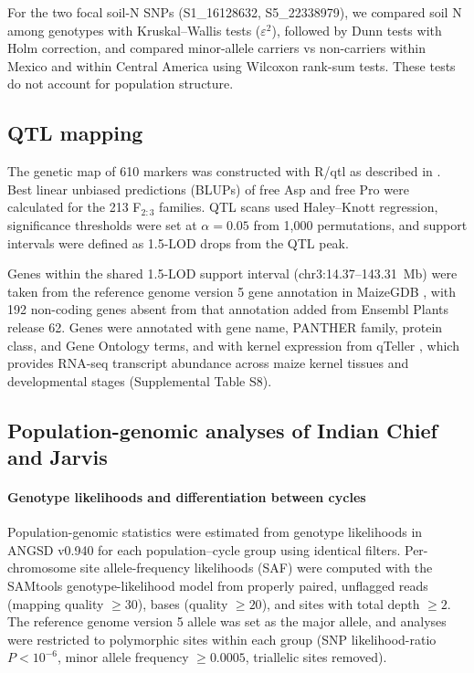 \documentclass[11pt]{article}
\begin{document}
For the two focal soil-N SNPs (S1\_16128632, S5\_22338979), we compared soil N among genotypes with Kruskal--Wallis tests ($\varepsilon^2$), followed by Dunn tests with Holm correction, and compared minor-allele carriers vs non-carriers within Mexico and within Central America using Wilcoxon rank-sum tests. These tests do not account for population structure.

\subsection*{QTL mapping}
The genetic map of 610 markers was constructed with R/qtl \citep{Broman2003} as described in \citet{Fitzsimmons2026KernelKitchen}. Best linear unbiased predictions (BLUPs) of free Asp and free Pro were calculated for the 213 F$_{2:3}$ families. QTL scans used Haley--Knott regression, significance thresholds were set at $\alpha = 0.05$ from 1,000 permutations, and support intervals were defined as 1.5-LOD drops from the QTL peak.

Genes within the shared 1.5-LOD support interval (chr3:14.37--143.31~Mb) were taken from the reference genome version 5 gene annotation in MaizeGDB \citep{MaizeGDB}, with 192 non-coding genes absent from that annotation added from Ensembl Plants release 62. Genes were annotated with gene name, PANTHER family, protein class, and Gene Ontology terms, and with kernel expression from qTeller \citep{qteller}, which provides RNA-seq transcript abundance across maize kernel tissues and developmental stages (Supplemental Table S8).

\subsection*{Population-genomic analyses of Indian Chief and Jarvis}

\paragraph*{Genotype likelihoods and differentiation between cycles}

Population-genomic statistics were estimated from genotype likelihoods in ANGSD v0.940 \citep{Korneliussen2014ANGSD} for each population–cycle group using identical filters. Per-chromosome site allele-frequency likelihoods (SAF) were computed with the SAMtools genotype-likelihood model from properly paired, unflagged reads (mapping quality $\ge 30$), bases (quality $\ge 20$), and sites with total depth $\ge 2$. The reference genome version 5 allele was set as the major allele, and analyses were restricted to polymorphic sites within each group (SNP likelihood-ratio $P < 10^{-6}$, minor allele frequency $\ge 0.0005$, triallelic sites removed).
\end{document}
